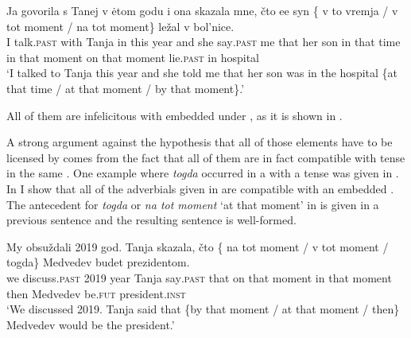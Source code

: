 \documentclass[output=paper,modfonts,newtxmath,hidelinks]{langscibook}
\begin{document}
\ea \label{20:ex17}
\gll Ja govorila s Tanej v ėtom godu i ona skazala mne, čto ee syn\hspace{4pt} \{\hspace{-2pt} v to vremja / v tot moment / na tot moment\} ležal v bol’nice.\\
     I talk\textsc{.past} with Tanja in this year and she say\textsc{.past} me that her son {} in that time {} in that moment {} on that moment lie\textsc{.past} in hospital\\
\glt `I talked to Tanja this year and she told me that her son was in the hospital \{at that time / at that moment / by that moment\}.'
\z

\noindent All of them are infelicitous with  embedded under , as it is shown in .

\label{20:ex18}
\z

\noindent A strong argument against the hypothesis that all of those elements have to be licensed by  comes from the fact that all of them are in fact compatible with  tense in the same . One example where \textit{togda} occurred in a  with a  tense was given in . In  I show that all of the adverbials given in  are compatible with an embedded . The antecedent for \textit{togda} or \textit{na tot moment} ‘at that moment’ in  is given in a previous sentence and the resulting sentence is well-formed.

\ea \label{20:ex19}
\gll My obsuždali 2019 god. Tanja skazala, čto \{\hspace{-2pt} na tot moment / v tot moment / togda\} Medvedev budet prezidentom.\\
     we discuss\textsc{.past} 2019 year Tanja say\textsc{.past} that {} on that moment {} in that moment {} then Medvedev be.\textsc{fut} president\textsc{.inst}\\
\glt `We discussed 2019. Tanja said that \{by that moment / at that moment / then\} Medvedev would be the president.'
\z
\end{document}
